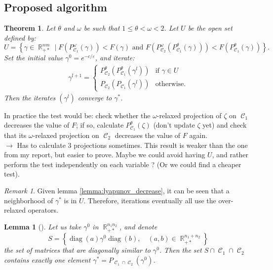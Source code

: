 \documentclass{article} %
\DeclareMathOperator{\IR}{\mathbb{R}}
\DeclareMathOperator{\Ccal}{\mathcal{C}}
\DeclareMathOperator{\diag}{diag}
\renewcommand{\epsilon}{\varepsilon}
\theoremstyle{plain}
\newtheorem{theorem}{Theorem}
\newtheorem{lemma}{Lemma}
\theoremstyle{definition}
\theoremstyle{remark}
\newtheorem{remark}{Remark}
\begin{document}
\subsection{Proposed algorithm}


\begin{theorem}\label{thm:algo}
	Let $\theta$ and $\omega$ be such that $1\le \theta < \omega < 2$. Let $U$ be the open set defined by:
	\begin{equation}\label{eq:open_set_U}
	U = \left\{
	\gamma \in \IR_{+*}^{nm} \mid
	F(P^\omega_{\Ccal_1}(\gamma)) < F(\gamma)
	\text{ and }
	F(P^\omega_{\Ccal_2}(P^\theta_{\Ccal_1}(\gamma))) < F(P^\theta_{\Ccal_1}(\gamma))
	\right\}.
	\end{equation}
	Set the initial value $\gamma^0 = e^{-c/\epsilon}$, and iterate:
	\begin{align*}
	\gamma^{l+1} =
	\begin{cases}
	P^\theta_{\Ccal_2}(P^\theta_{\Ccal_1}(\gamma^l)) & \text{if } \gamma \in U \\
	P_{\Ccal_2}(P_{\Ccal_1}(\gamma^l)) & \text{otherwise.}
	\end{cases}
	\end{align*}
	Then the iterates $(\gamma^l)$ converge to $\gamma^*$.
\end{theorem}
{\color{red} 
	In practice the test would be: check whether the $\omega$-relaxed projection of $\zeta$ on $\Ccal_1$ decreases the value of
	$F$; if so, calculate $P_{\Ccal_1}^\theta(\zeta)$ (don't update $\zeta$ yet) and check that its $\omega$-relaxed projection on $\Ccal_2$ decreases the value of $F$ again. \\
	$\longrightarrow$ Has to calculate 3 projections sometimes. This result is weaker than the one from my report, but easier to prove. Maybe we could avoid having $U$, and rather perform the test independently on each variable ? (Or we could find a cheaper test).}
\begin{remark}
	Given lemma \ref{lemma:lyapunov_decrease}, it can be seen that a neighborhood of $\gamma^*$ is in $U$. Therefore, iterations eventually all use the over-relaxed operators.
\end{remark}


\begin{lemma}[\cite{cuturi13}]
	\label{lemma:trivial_intersection}
	Let us take $\gamma^0$ in $\IR_{+*}^{n_1 n_2}$,
	and denote
	\[
	S = \left\{
	\diag(a) \gamma^0 \diag(b),\quad
	(a,b) \in \IR_{+*}^{n_1 + n_2}
	\right\}
	\]
	the set of matrices that are diagonally similar to $\gamma^0$.
	Then the set $S \cap \Ccal_1 \cap \Ccal_2$ contains exactly one element $\gamma^* = P_{\Ccal_1 \cap \Ccal_2}(\gamma^0)$.
\end{lemma}
\end{document}
